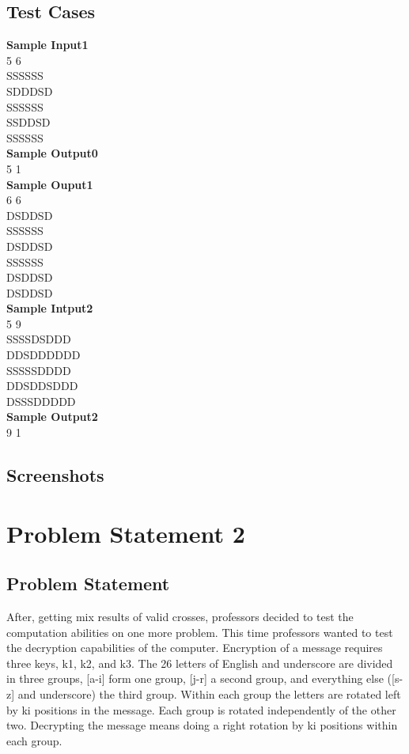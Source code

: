 \documentclass[a4paper,12pt]{article}
\begin{document}
\subsection{Test Cases}
\textbf{Sample Input1}\\
5 6 \\
SSSSSS\\
SDDDSD\\
SSSSSS\\
SSDDSD\\
SSSSSS\\
\textbf{Sample Output0} \\
5 1\\
\textbf{Sample Ouput1} \\
6 6 \\
DSDDSD\\
SSSSSS\\
DSDDSD\\
SSSSSS\\
DSDDSD\\
DSDDSD\\
\textbf{Sample Intput2} \\
5 9 \\
SSSSDSDDD\\
DDSDDDDDD\\
SSSSSDDDD\\
DDSDDSDDD\\
DSSSDDDDD\\

\textbf{Sample Output2} \\
9 1



\subsection{Screenshots}



\section{Problem Statement 2}
\subsection{Problem Statement}
After, getting mix results of valid crosses, professors decided to test the computation abilities on one more problem. This time professors wanted to test the decryption capabilities of the computer.
Encryption of  a message requires three keys, k1, k2, and k3. The 26 letters of English and underscore are divided in three groups,  [a-i] form one group, [j-r] a second group, and everything else ([s-z] and underscore) the third group. Within each group the letters are rotated left by ki positions in the message. Each group is rotated independently of the other two. Decrypting the message means doing a right rotation by ki positions within each group.
\end{document}

